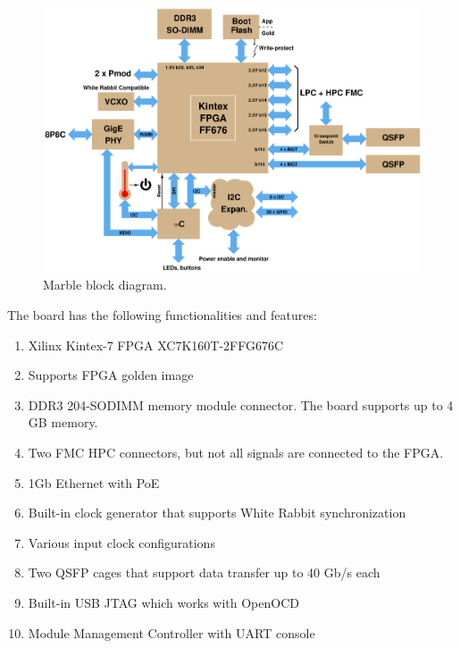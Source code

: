 \documentclass[12pt,oneside,a4]{article}
\begin{document}
\begin{figure}[H]
\begin{center}
\includegraphics[width=1\linewidth]{block_k3.png}
 \caption{Marble block diagram.}\label{block}
\end{center}
\end{figure}

The board has the following functionalities and features:
\begin{enumerate}
	\item Xilinx Kintex-7 FPGA XC7K160T-2FFG676C
	\item Supports FPGA golden image
	\item DDR3 204-SODIMM memory module connector. The board supports up to 4 GB memory.
	\item Two FMC HPC connectors, but not all signals are connected to the FPGA.
	\item 1Gb Ethernet with PoE
	\item Built-in clock generator that supports White Rabbit synchronization
	\item Various input clock configurations
	\item Two QSFP cages that support data transfer up to 40 Gb/s each
	\item Built-in USB JTAG which works with OpenOCD
	\item Module Management Controller with UART console
\end{enumerate}
\end{document}
